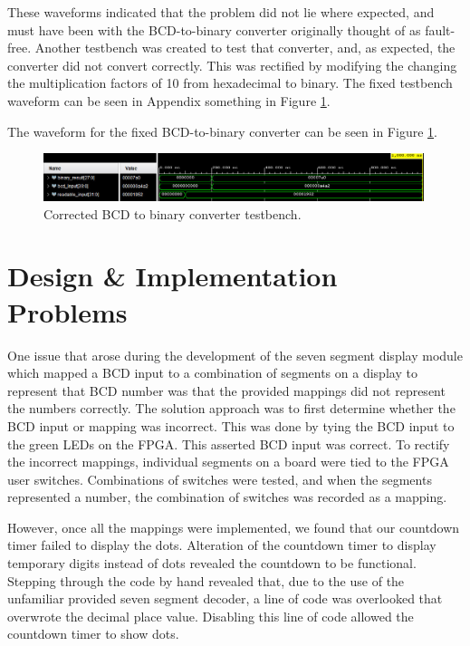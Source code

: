 \documentclass[11pt]{article}
\begin{document}
These waveforms indicated that the problem did not lie where expected, and must have been with the BCD-to-binary converter originally thought of as fault-free. Another testbench was created to test that converter, and, as expected, the converter did not convert correctly. This was rectified by modifying the changing the multiplication factors of 10 from hexadecimal to binary. The fixed testbench waveform can be seen in Appendix something in Figure \ref{fig:correct_converter_tb}.

The waveform for the fixed BCD-to-binary converter can be seen in Figure \ref{fig:correct_converter_tb}.

\begin{figure}[H]
  \centering
  \includegraphics[width=0.99\textwidth]{WhatsApp Image 2025-05-08 at 16.13.24}
  \caption{Corrected BCD to binary converter testbench.}
  \label{fig:correct_converter_tb}
\end{figure}

\section{Design \& Implementation Problems}

One issue that arose during the development of the seven segment display module which mapped a BCD input to a combination of segments on a display to represent that BCD number was that the provided mappings did not represent the numbers correctly. The solution approach was to first determine whether the BCD input or mapping was incorrect. This was done by tying the BCD input to the green LEDs on the FPGA. This asserted BCD input was correct. To rectify the incorrect mappings, individual segments on a board were tied to the FPGA user switches. Combinations of switches were tested, and when the segments represented a number, the combination of switches was recorded as a mapping.

However, once all the mappings were implemented, we found that our countdown timer failed to display the dots. Alteration of the countdown timer to display temporary digits instead of dots revealed the countdown to be functional. Stepping through the code by hand revealed that, due to the use of the unfamiliar provided seven segment decoder, a line of code was overlooked that overwrote the decimal place value. Disabling this line of code allowed the countdown timer to show dots.
\end{document}
